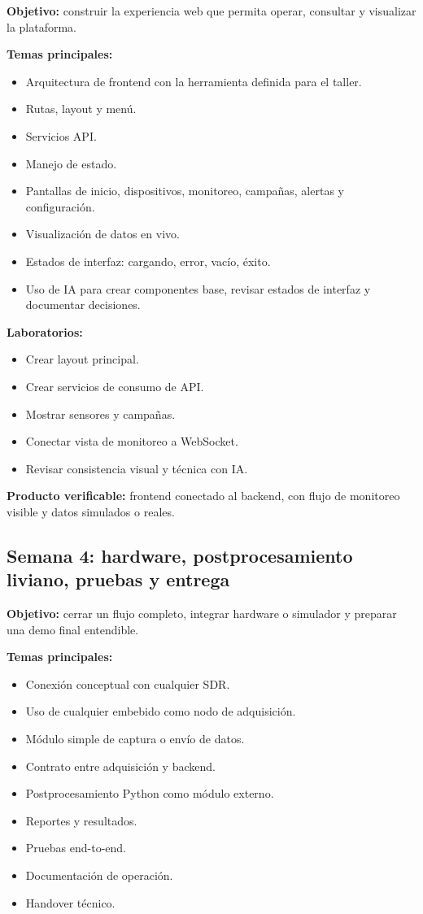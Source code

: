 \documentclass[11pt,a4paper]{article}
\newcommand{\producto}{\textbf{Producto verificable:} }
\begin{document}
\textbf{Objetivo:} construir la experiencia web que permita operar, consultar y visualizar la plataforma.

\textbf{Temas principales:}

\begin{itemize}
  \item Arquitectura de frontend con la herramienta definida para el taller.
  \item Rutas, layout y menú.
  \item Servicios API.
  \item Manejo de estado.
  \item Pantallas de inicio, dispositivos, monitoreo, campañas, alertas y configuración.
  \item Visualización de datos en vivo.
  \item Estados de interfaz: cargando, error, vacío, éxito.
  \item Uso de IA para crear componentes base, revisar estados de interfaz y documentar decisiones.
\end{itemize}

\textbf{Laboratorios:}

\begin{itemize}
  \item Crear layout principal.
  \item Crear servicios de consumo de API.
  \item Mostrar sensores y campañas.
  \item Conectar vista de monitoreo a WebSocket.
  \item Revisar consistencia visual y técnica con IA.
\end{itemize}

\producto frontend conectado al backend, con flujo de monitoreo visible y datos simulados o reales.

\subsection*{Semana 4: hardware, postprocesamiento liviano, pruebas y entrega}

\textbf{Objetivo:} cerrar un flujo completo, integrar hardware o simulador y preparar una demo final entendible.

\textbf{Temas principales:}

\begin{itemize}
  \item Conexión conceptual con cualquier SDR.
  \item Uso de cualquier embebido como nodo de adquisición.
  \item Módulo simple de captura o envío de datos.
  \item Contrato entre adquisición y backend.
  \item Postprocesamiento Python como módulo externo.
  \item Reportes y resultados.
  \item Pruebas end-to-end.
  \item Documentación de operación.
  \item Handover técnico.
\end{itemize}
\end{document}
